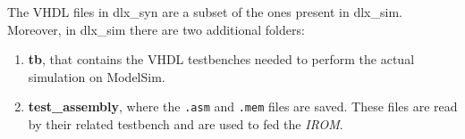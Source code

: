 The VHDL files in dlx\_syn are a subset of the ones present in dlx\_sim. Moreover, in dlx\_sim there are two additional folders:

\begin{enumerate}
    \item \textbf{tb}, that contains the VHDL testbenches needed to perform the actual simulation on ModelSim.
    \item \textbf{test\_assembly}, where the \verb|.asm| and \verb|.mem| files are saved. These files are read by their related testbench and are used to fed the {\it IROM}.
\end{enumerate}